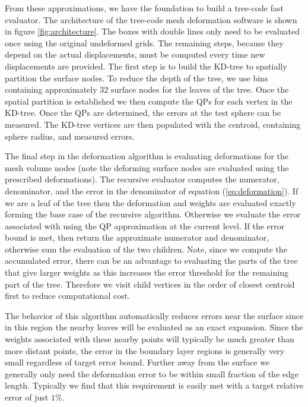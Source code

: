 From these approximations, we have the foundation to build a tree-code
fast evaluator.  The architecture of the tree-code mesh deformation
software is shown in figure \ref{fig:architecture}.  The boxes with
double lines only need to be evaluated once using the original
undeformed grids.  The remaining steps, because they depend on the
actual displacements, must be computed every time new displacements are
provided.  The first step is to build the KD-tree to spatially
partition the surface nodes.  To reduce the depth of the tree, we use
bins containing approximately 32 surface nodes for the leaves of the tree.
Once the spatial partition is established we then compute the QPs for
each vertex in the KD-tree.  Once the QPs are determined, the errors
at the test sphere can be measured.  The KD-tree vertices are then
populated with the centroid, containing sphere radius, and measured
errors.  

The final step in the deformation algorithm is evaluating deformations
for the mesh volume nodes (note the deforming surface nodes are
evaluated using the prescribed deformations).  The recursive evaluator
computes the numerator, denominator, and the error in the denominator
of equation (\ref{eq:deformation}).  If we are a leaf of the tree then
the deformation and weights are evaluated exactly forming the base
case of the recursive algorithm.  Otherwise we evaluate the error
associated with using the QP approximation at the current level.  If
the error bound is met, then return the approximate numerator and
denominator, otherwise sum the evaluation of the two children.  Note,
since we compute the accumulated error, there can be an advantage to
evaluating the parts of the tree that give larger weights as this
increases the error threshold for the remaining part of the tree.
Therefore we visit child vertices in the order of closest centroid
first to reduce computational cost.

The behavior of this algorithm automatically reduces errors near the
surface since in this region the nearby leaves will be evaluated as an
exact expansion.  Since the weights associated with these nearby
points will typically be much greater than more distant points, the
error in the boundary layer regions is generally very small regardless
of target error bound.  Further away from the surface we generally
only need the deformation error to be within small fraction of the
edge length.  Typically we find that this requirement is easily met
with a target relative error of just $1\%$.



